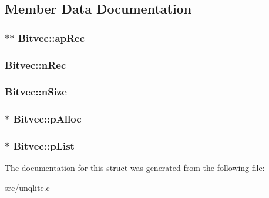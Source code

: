 \subsection{Member Data Documentation}
\hypertarget{struct_bitvec_a02bb36fb54a6f9f30caa88113e3bbe6b}{
\subsubsection[{ap\-Rec}]{$\ast$$\ast$ Bitvec\-::ap\-Rec}}\label{d1/d89/struct_bitvec_a02bb36fb54a6f9f30caa88113e3bbe6b}
\hypertarget{struct_bitvec_a769dc2d5dd2e4c1b4ce3c685263a59f1}{
\subsubsection[{n\-Rec}]{ Bitvec\-::n\-Rec}}\label{d1/d89/struct_bitvec_a769dc2d5dd2e4c1b4ce3c685263a59f1}
\hypertarget{struct_bitvec_a66ca53c19baef4df2d8e5c08838cf61d}{
\subsubsection[{n\-Size}]{ Bitvec\-::n\-Size}}\label{d1/d89/struct_bitvec_a66ca53c19baef4df2d8e5c08838cf61d}
\hypertarget{struct_bitvec_a3afb07b9af8a05a52168b0b4e80c6657}{
\subsubsection[{p\-Alloc}]{$\ast$ Bitvec\-::p\-Alloc}}\label{d1/d89/struct_bitvec_a3afb07b9af8a05a52168b0b4e80c6657}
\hypertarget{struct_bitvec_a012332012731a4b31ea49a4108a568f3}{
\subsubsection[{p\-List}]{$\ast$ Bitvec\-::p\-List}}\label{d1/d89/struct_bitvec_a012332012731a4b31ea49a4108a568f3}


The documentation for this struct was generated from the following file\-:\begin{DoxyCompactItemize}
\item 
src/\hyperlink{unqlite_8c}{unqlite.\-c}\end{DoxyCompactItemize}
